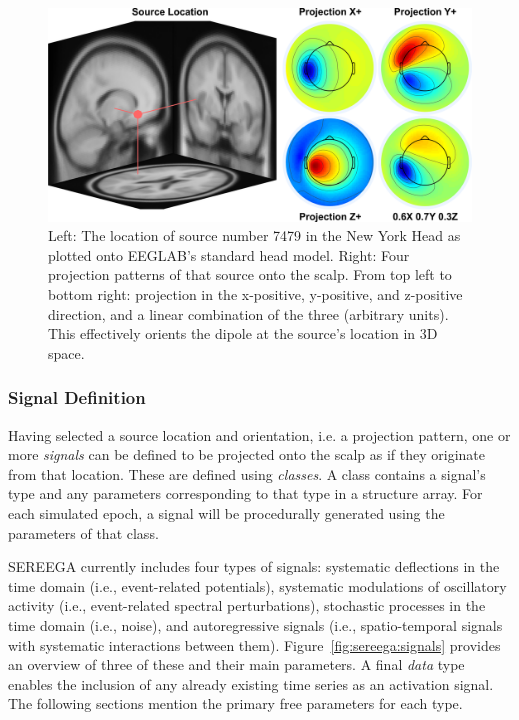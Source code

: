 \begin{figure}
    \centering
    \includegraphics[width=5in]{figures/sereega-source.png}
    \caption[A source dipole's location and projection patterns.]{Left: The location of source number 7479 in the New York Head as plotted onto EEGLAB's standard head model. Right: Four projection patterns of that source onto the scalp. From top left to bottom right: projection in the x-positive, y-positive, and z-positive direction, and a linear combination of the three (arbitrary units). This effectively orients the dipole at the source's location in 3D space.}
    \label{fig:sereega:source}
\end{figure}


\subsubsection{Signal Definition}
\label{sereega:signals}

Having selected a source location and orientation, i.e. a projection pattern, one or more \emph{signals} can be defined to be projected onto the scalp as if they originate from that location. These are defined using \emph{classes}. A class contains a signal's type and any parameters corresponding to that type in a structure array. For each simulated epoch, a signal will be procedurally generated using the parameters of that class.

SEREEGA currently includes four types of signals: systematic deflections in the time domain (i.e., event-related potentials), systematic modulations of oscillatory activity (i.e., event-related spectral perturbations), stochastic processes in the time domain (i.e., noise), and autoregressive signals (i.e., spatio-temporal signals with systematic interactions between them). Figure~\ref{fig:sereega:signals} provides an overview of three of these and their main parameters. A final \emph{data} type enables the inclusion of any already existing time series as an activation signal. The following sections mention the primary free parameters for each type.

